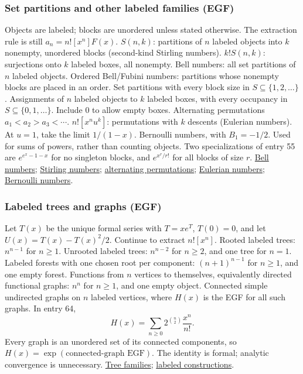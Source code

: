 \subsubsection*{Set partitions and other labeled families (EGF)}
Objects are labeled; blocks are unordered unless stated otherwise.
The extraction rule is still $a_n=n![x^n]F(x)$.
  {$S(n,k)$: partitions of $n$ labeled objects into $k$ nonempty, unordered blocks (second-kind Stirling numbers).}
  {$k!S(n,k)$: surjections onto $k$ labeled boxes, all nonempty.}
  {Bell numbers: all set partitions of $n$ labeled objects.}
  {Ordered Bell/Fubini numbers: partitions whose nonempty blocks are placed in an order.}
  {Set partitions with every block size in $S\subseteq\{1,2,\ldots\}$.}
  {Assignments of $n$ labeled objects to $k$ labeled boxes, with every occupancy in $S\subseteq\{0,1,\ldots\}$. Include $0$ to allow empty boxes.}
  {Alternating permutations $a_1<a_2>a_3<\cdots$.}
  {$n![x^nu^k]$: permutations with $k$ descents (Eulerian numbers). At $u=1$, take the limit $1/(1-x)$.}
  {Bernoulli numbers, with $B_1=-1/2$. Used for sums of powers, rather than counting objects.}
Two specializations of entry 55 are $e^{e^x-1-x}$ for no singleton
blocks, and $e^{x^r/r!}$ for all blocks of size $r$.
\href{https://dlmf.nist.gov/26.7}{Bell numbers};
\href{https://dlmf.nist.gov/26.8}{Stirling numbers};
\href{https://mathweb.ucsd.edu/~projectp/warmups/eQ.html}{alternating permutations};
\href{https://dlmf.nist.gov/26.14}{Eulerian numbers};
\href{https://dlmf.nist.gov/24.2}{Bernoulli numbers}.

\subsubsection*{Labeled trees and graphs (EGF)}
Let $T(x)$ be the unique formal series with $T=xe^T$, $T(0)=0$,
and let $U(x)=T(x)-T(x)^2/2$. Continue to extract $n![x^n]$.
  {Rooted labeled trees: $n^{n-1}$ for $n\ge1$.}
  {Unrooted labeled trees: $n^{n-2}$ for $n\ge2$, and one tree for $n=1$.}
  {Labeled forests with one chosen root per component: $(n+1)^{n-1}$ for $n\ge1$, and one empty forest.}
  {Functions from $n$ vertices to themselves, equivalently directed functional graphs: $n^n$ for $n\ge1$, and one empty object.}
  {Connected simple undirected graphs on $n$ labeled vertices, where $H(x)$ is the EGF for all such graphs.}
In entry 64,
\[
  H(x)=\sum_{n\ge0}2^{\binom{n}{2}}\frac{x^n}{n!}.
\]
Every graph is an unordered set of its connected components, so
$H(x)=\exp(\text{connected-graph EGF})$. The identity is formal;
analytic convergence is unnecessary.
\href{https://aofa.cs.princeton.edu/60trees/}{Tree families};
\href{https://aofa.cs.princeton.edu/50ac/}{labeled constructions}.

